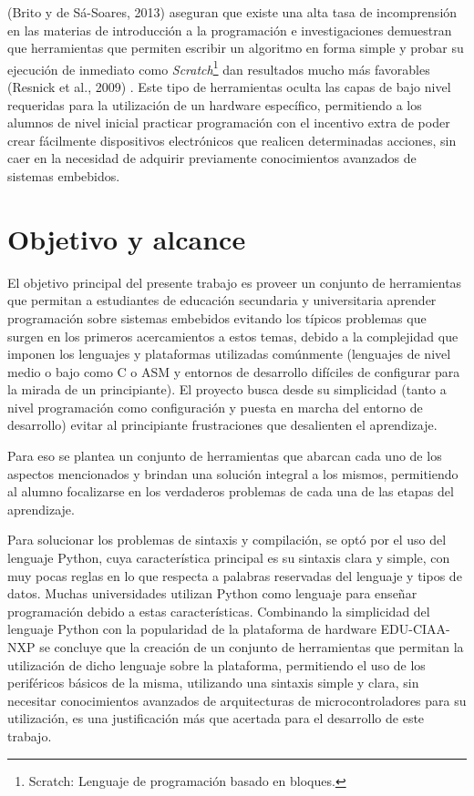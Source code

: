 (Brito y de Sá-Soares, 2013) \cite{papereducacion3} aseguran que existe una alta tasa de incomprensión en las materias de introducción a la programación e investigaciones demuestran que herramientas que permiten escribir un algoritmo en forma simple y probar su ejecución de inmediato como \textit{Scratch}\footnote{Scratch: Lenguaje de programación basado en bloques.} dan resultados mucho más favorables (Resnick et al., 2009) \cite{papereducacion4}. Este tipo de herramientas oculta las capas de bajo nivel requeridas para la utilización de un hardware específico, permitiendo a los alumnos de nivel inicial practicar programación con el incentivo extra de poder crear fácilmente dispositivos electrónicos que realicen determinadas acciones, sin caer en la necesidad de adquirir previamente conocimientos avanzados de sistemas embebidos.


\section{Objetivo y alcance}

El objetivo principal del presente trabajo es proveer un conjunto de herramientas que permitan a estudiantes de educación secundaria y universitaria aprender programación sobre sistemas embebidos evitando los típicos problemas que surgen en los primeros acercamientos a estos temas, debido a la complejidad que imponen los lenguajes y plataformas utilizadas comúnmente (lenguajes de nivel medio o bajo como C o ASM y entornos de desarrollo difíciles de configurar para la mirada de un principiante).
El proyecto busca desde su simplicidad (tanto a nivel programación como configuración y puesta en marcha del entorno de desarrollo) evitar al principiante frustraciones que desalienten el aprendizaje.

Para eso se plantea un conjunto de herramientas que abarcan cada uno de los aspectos mencionados y brindan una solución integral a los mismos, permitiendo al alumno focalizarse en los verdaderos problemas de cada una de las etapas del aprendizaje.
 
Para solucionar los problemas de sintaxis y compilación, se optó por el uso del lenguaje Python, cuya característica principal es su sintaxis clara y simple, con muy pocas reglas en lo que respecta a palabras reservadas del lenguaje y tipos de datos. Muchas universidades utilizan Python como lenguaje para enseñar programación debido a estas características\cite{papereducacion}. Combinando la simplicidad del lenguaje Python con la popularidad de la plataforma de hardware EDU-CIAA-NXP se concluye que la creación de un conjunto de herramientas que permitan la utilización de dicho lenguaje sobre la plataforma, permitiendo el uso de los periféricos básicos de la misma, utilizando una sintaxis simple y clara, sin necesitar conocimientos avanzados de arquitecturas de microcontroladores para su utilización, es una justificación más que acertada para el desarrollo de este trabajo.

